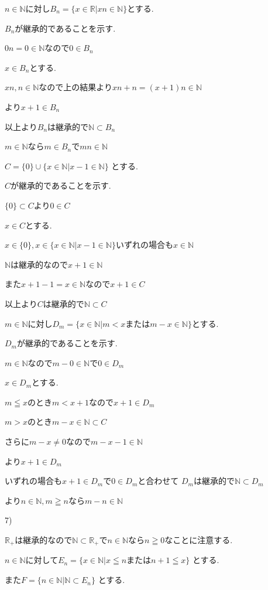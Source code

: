 \documentclass{jsarticle}
\begin{document}
$n\in \mathbb{N}$に対し$B_n=\{x\in \mathbb{R}|xn\in\mathbb{N}\}$とする.

$B_n$が継承的であることを示す.

$0n = 0\in \mathbb{N}$なので$0\in B_n$

$x\in B_n$とする.

$xn,n\in \mathbb{N}$なので上の結果より$xn+n=(x+1)n\in \mathbb{N}$

より$x+1\in B_n$

以上より$B_n$は継承的で$\mathbb{N} \subset B_n$

$m\in \mathbb{N}$なら$m\in B_n$で$mn\in\mathbb{N}$

$C=\{0\}\cup \{x\in \mathbb{N}|x-1\in\mathbb{N}\}$
とする.

$C$が継承的であることを示す.

$\{0\}\subset C$より$0\in C$

$x\in C$とする.

$x\in\{0\},x\in \{x\in \mathbb{N}|x-1\in\mathbb{N}\}$いずれの場合も$x\in\mathbb{N}$

$\mathbb{N}$は継承的なので$x+1\in\mathbb{N}$

また$x+1-1=x\in \mathbb{N}$なので$x+1\in C$

以上より$C$は継承的で$\mathbb{N} \subset C$

$m\in \mathbb{N}$に対し$D_m=\{x\in \mathbb{N}|m< x または m-x\in\mathbb{N}\}$とする.

$D_m$が継承的であることを示す.

$m\in \mathbb{N}$なので$m-0\in \mathbb{N}$で$0\in D_m$

$x\in D_m$とする.

$m\leqq x$のとき$m<x+1$なので$x+1\in D_m$

$m>x$のとき$m-x\in \mathbb{N}\subset C$

さらに$m-x\neq 0$なので$m-x-1\in\mathbb{N}$

より$x+1\in D_m$

いずれの場合も$x+1\in D_m$で$0\in D_m$と合わせて
$D_m$は継承的で$\mathbb{N} \subset D_m$

より$n\in \mathbb{N},m\geqq n$なら$m-n\in\mathbb{N}$

7)

$\mathbb{R}_+$は継承的なので$\mathbb{N}\subset \mathbb{R}_+$で$n\in \mathbb{N}$なら$n\geqq 0$なことに注意する.

$n\in \mathbb{N}$に対して$E_n=\{x\in \mathbb{N}|x\leqq nまたは n+1\leqq x\}$
とする.

また$F=\{n\in \mathbb{N}|\mathbb{N}\subset E_n\}$
とする.
\end{document}
